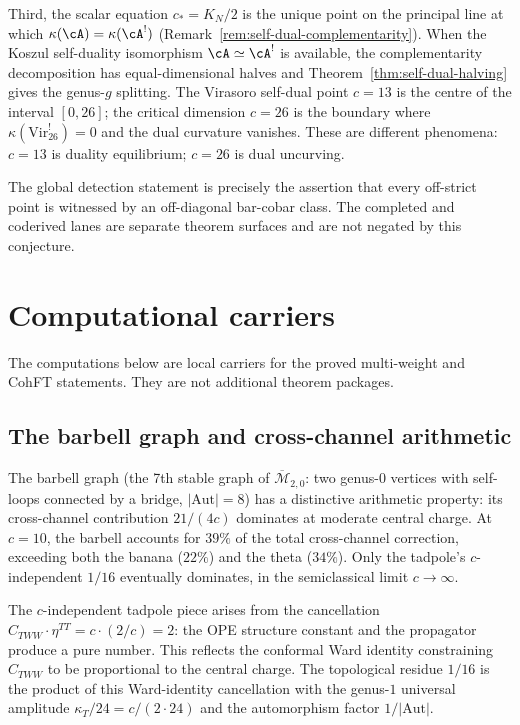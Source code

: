 \begin{remark}
Third, the scalar equation $c_* = K_N/2$ is the unique point on the
principal line at which $\kappa(\cA) = \kappa(\cA^!)$
(Remark~\ref{rem:self-dual-complementarity}). When the Koszul
self-duality isomorphism $\cA\simeq\cA^!$ is available, the
complementarity decomposition has equal-dimensional halves and
Theorem~\ref{thm:self-dual-halving} gives the genus-$g$ splitting.
The Virasoro self-dual point $c = 13$ is the centre of
the interval $[0, 26]$; the critical dimension $c = 26$
is the boundary where $\kappa(\mathrm{Vir}_{26}^!) = 0$
and the dual curvature vanishes.
These are different phenomena: $c = 13$ is duality
equilibrium; $c = 26$ is dual uncurving.

The global detection statement is precisely the assertion that every
off-strict point is witnessed by an off-diagonal bar-cobar class.
The completed and coderived lanes are separate theorem
surfaces and are not negated by this conjecture.
\end{remark}


\section{Computational carriers}
\label{sec:frontier-research-notes}

The computations below are local carriers for the proved multi-weight
and CohFT statements. They are not additional theorem packages.

\subsection{The barbell graph and cross-channel arithmetic}
\label{subsec:barbell-research-notes}

The barbell graph (the 7th stable graph of
$\overline{\mathcal{M}}_{2,0}$: two genus-$0$ vertices with
self-loops connected by a bridge, $|\mathrm{Aut}| = 8$) has a
distinctive arithmetic property: its cross-channel contribution
$21/(4c)$ dominates at moderate central charge. At $c = 10$, the
barbell accounts for $39\%$ of the total cross-channel correction,
exceeding both the banana ($22\%$) and the theta ($34\%$). Only the
tadpole's $c$-independent $1/16$ eventually dominates, in the
semiclassical limit $c \to \infty$.

The $c$-independent tadpole piece arises from the cancellation
$C_{TWW} \cdot \eta^{TT} = c \cdot (2/c) = 2$: the OPE structure
constant and the propagator produce a pure number. This reflects the
conformal Ward identity constraining $C_{TWW}$ to be proportional to
the central charge. The topological residue $1/16$ is the product of
this Ward-identity cancellation with the genus-$1$ universal amplitude
$\kappa_T/24 = c/(2 \cdot 24)$ and the automorphism factor
$1/|\mathrm{Aut}|$.


